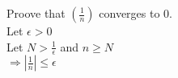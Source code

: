 \documentclass{article}
\begin{document}
\noindent Proove that $(\frac{1}{n})$ converges to 0.\\
Let $\epsilon > 0$\\
Let $N > \frac{1}{\epsilon} $ and $ n \geq N$\\
$\Rightarrow  |\frac{1}{n}| \leq \epsilon$
\end{document}
